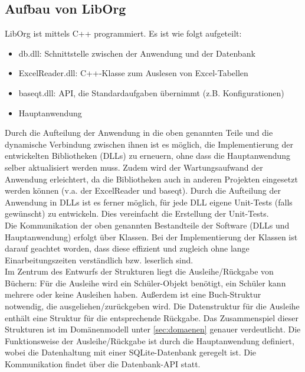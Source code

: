 \subsection{Aufbau von LibOrg}
LibOrg ist mittels C++ programmiert. Es ist wie folgt aufgeteilt:
\begin{itemize}
	\item db.dll: Schnittstelle zwischen der Anwendung und der Datenbank
	\item ExcelReader.dll: C++-Klasse zum Auslesen von Excel-Tabellen
	\item baseqt.dll: API, die Standardaufgaben übernimmt (z.B. Konfigurationen)
	\item Hauptanwendung
\end{itemize}
Durch die Aufteilung der Anwendung in die oben genannten Teile und die dynamische Verbindung zwischen ihnen ist es möglich, die Implementierung der entwickelten Bibliotheken (DLLs) zu erneuern, ohne dass die Hauptanwendung selber aktualisiert werden muss. Zudem wird der Wartungsaufwand der Anwendung erleichtert, da die Bibliotheken auch in anderen Projekten eingesetzt werden können (v.a. der ExcelReader und baseqt). Durch die Aufteilung der Anwendung in DLLs ist es ferner möglich, für jede DLL eigene Unit-Tests (falls gewünscht) zu entwickeln. Dies vereinfacht die Erstellung der Unit-Tests.\bigskip \\
Die Kommunikation der oben genannten Bestandteile der Software (DLLs und Hauptanwendung) erfolgt über Klassen. Bei der Implementierung der Klassen ist darauf geachtet worden, dass diese effizient und zugleich ohne lange Einarbeitungszeiten verständlich bzw. leserlich sind.\bigskip \\
Im Zentrum des Entwurfs der Strukturen liegt die Ausleihe/Rückgabe von Büchern: Für die Ausleihe wird ein Schüler-Objekt benötigt, ein Schüler kann mehrere oder keine Ausleihen haben. Außerdem ist eine Buch-Struktur notwendig, die ausgeliehen/zurückgeben wird. Die Datenstruktur für die Ausleihe enthält eine Struktur für die entsprechende Rückgabe. Das Zusammenspiel dieser Strukturen ist im Domänenmodell unter \ref{sec:domaenen} genauer verdeutlicht. Die Funktionsweise der Ausleihe/Rückgabe ist durch die Hauptanwendung definiert, wobei die Datenhaltung mit einer SQLite-Datenbank geregelt ist. Die Kommunikation findet über die Datenbank-API statt.


